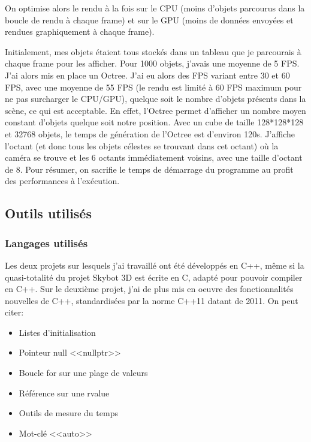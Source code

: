 \documentclass[a4paper,french,12pt]{article}
\begin{document}
		  
		 On optimise alors le rendu à la fois sur le CPU (moins d'objets parcourus dans la boucle
			       de rendu à chaque frame) et sur le GPU (moins de données envoyées et 
			       rendues graphiquement à chaque frame).  
		  		
		
		Initialement, mes objets étaient tous stockés dans un tableau que je parcourais à chaque frame pour les afficher.
		Pour 1000 objets, j'avais une moyenne de 5 FPS. 
		J'ai alors mis en place un Octree. J'ai eu alors des FPS variant entre 30 et 60 FPS, avec une moyenne de 55 FPS
		(le rendu est limité à 60 FPS maximum
		pour ne pas surcharger le CPU/GPU), quelque soit le nombre d'objets présents dans la scène, ce qui est acceptable.
		En effet, l'Octree permet d'afficher un nombre moyen constant d'objets quelque soit notre position.
		Avec un cube de taille 128*128*128 et 32768 objets, le temps de génération de l'Octree est d'environ 120s.
		J'affiche l'octant (et donc tous les objets célestes se trouvant dans cet octant) où la caméra se trouve
		et les 6 octants immédiatement voisins, avec une taille d'octant de 8.
		Pour résumer, on sacrifie le temps de démarrage du programme au profit des performances à l'exécution.


	\subsection{Outils utilisés}

		\subsubsection{Langages utilisés}
		    Les deux projets sur lesquels j'ai travaillé ont été développés en C++, même si la quasi-totalité 
		    du projet Skybot 3D est écrite en C, adapté pour pouvoir compiler en C++.
		    Sur le deuxième projet, j'ai de plus mis en oeuvre des fonctionnalités nouvelles de C++, standardisées
		    par la norme C++11 datant de 2011. On peut citer:
		    \begin{itemize}
		     \item Listes d'initialisation 
		     \item Pointeur null <<nullptr>>
		     \item Boucle for sur une plage de valeurs
		     \item Référence sur une rvalue
		     \item Outils de mesure du temps
		     \item Mot-clé <<auto>>
		    \end{itemize}
	
\end{document}
